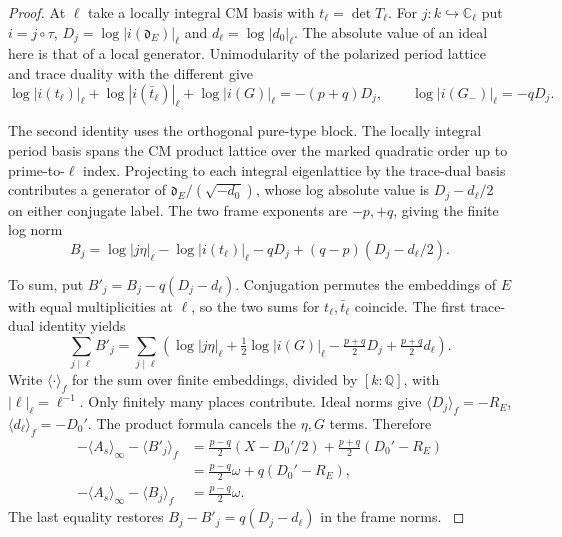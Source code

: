\begin{proof}
At \(\ell\) take a locally integral CM basis with
\(t_\ell=\det T_\ell\). For \(j:k\hookrightarrow\mathbb C_\ell\)
put \(i=j\circ\tau\), \(D_j=\log|i(\mathfrak d_E)|_\ell\) and
\(d_\ell=\log|d_0|_\ell\). The absolute value of an ideal here is
that of a local generator. Unimodularity of the polarized period
lattice and trace duality with the different give
\[
 \log|i(t_\ell)|_\ell+\log|i(\bar t_\ell)|_\ell+\log|i(G)|_\ell
       =-(p+q)D_j,\qquad \log|i(G_-)|_\ell=-qD_j .
\]

The second identity uses the orthogonal pure-type block. The
locally integral period basis spans the CM product lattice over
the marked quadratic order up to prime-to-\(\ell\) index.
Projecting to each integral eigenlattice by the trace-dual basis
contributes a generator of \(\mathfrak d_E/(\sqrt{-d_0})\), whose
log absolute value is \(D_j-d_\ell/2\) on either conjugate
label. The two frame exponents are \(-p,+q\), giving the finite log norm
\[
 B_j=\log|j\eta|_\ell-\log|i(t_\ell)|_\ell-qD_j
                              +(q-p)(D_j-d_\ell/2).
\]
\label{cor:deep-cover-flat-degree-10}

To sum, put \(B'_j=B_j-q(D_j-d_\ell)\). Conjugation permutes
the embeddings of \(E\) with equal multiplicities at \(\ell\),
so the two sums for \(t_\ell,\bar t_\ell\) coincide. The first
trace-dual identity yields
\[
 \sum_{j\mid\ell} B'_j
 =\sum_{j\mid\ell}\left(\log|j\eta|_\ell+\tfrac12\log|i(G)|_\ell
              -\tfrac{p+q}{2}D_j+\tfrac{p+q}{2}d_\ell\right).
\]
Write \(\langle\cdot\rangle_f\) for the sum over finite embeddings,
divided by \([k:\mathbb Q]\), with \(|\ell|_\ell=\ell^{-1}\).
Only finitely many places contribute. Ideal norms give
\(\langle D_j\rangle_f=-R_E\), \(\langle d_\ell\rangle_f=-D_0'\).
The product formula cancels the \(\eta,G\) terms. Therefore
\[
 \begin{aligned}
 -\langle A_s\rangle_\infty-\langle B'_j\rangle_f
 &=\tfrac{p-q}{2}(X-D_0'/2)+\tfrac{p+q}{2}(D_0'-R_E)\\
 &=\tfrac{p-q}{2}\omega+q(D_0'-R_E),\\
 -\langle A_s\rangle_\infty-\langle B_j\rangle_f
 &=\tfrac{p-q}{2}\omega .
 \end{aligned}
\]
The last equality restores \(B_j-B'_j=q(D_j-d_\ell)\) in the
frame norms. \label{cor:deep-cover-flat-degree-11}
\end{proof}
